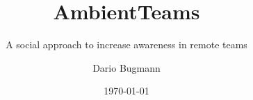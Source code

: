 \documentclass{seal_thesis}
\date{\today}
\title{AmbientTeams}
\subtitle{A social approach to increase awareness in remote teams}
\author{Dario Bugmann}
\begin{document}
\maketitle

\frontmatter

\begin{acknowledgements}

\end{acknowledgements}

\begin{abstract}
\end{abstract}

\begin{zusammenfassung}
\end{zusammenfassung}

\tableofcontents
\listoffigures
\listoftables
\lstlistoflistings

\mainmatter









\backmatter
% 
% 
\printbibliography
\end{document}

